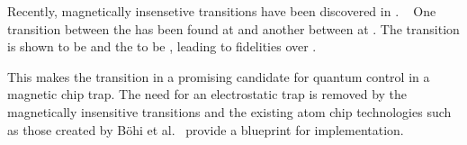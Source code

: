 Recently, magnetically insensetive transitions have been discovered in .
~\cite{PhysRevLett.120.163201, Blackmore_2018, }  One transition between the 
has been found at  and another between  at
. The  transition is shown to be  and
the  to be , leading to fidelities over
.

This makes the  transition in  a promising candidate for
quantum control in a magnetic chip trap. The need for an electrostatic trap is
removed by the magnetically insensitive transitions and the existing atom chip
technologies such as those created by B\"ohi et al.~\cite{Boehi2009} provide a
blueprint for implementation.
